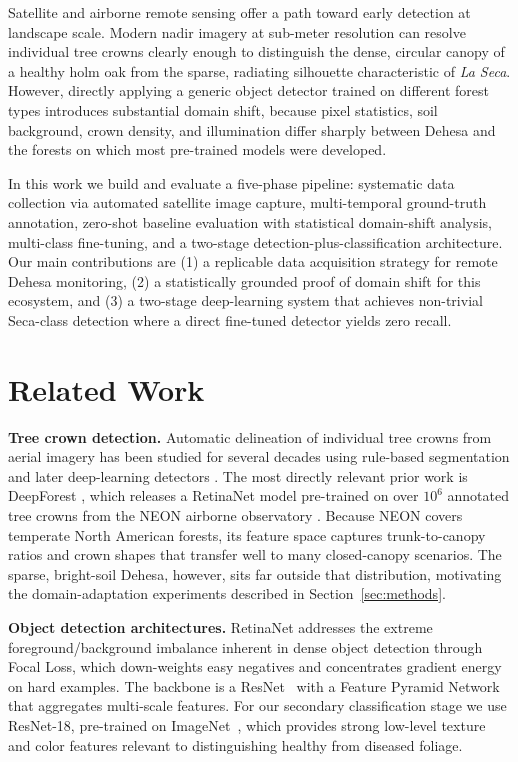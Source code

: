 \documentclass[10pt,twocolumn]{article}
\begin{document}
Satellite and airborne remote sensing offer a path toward early detection at
landscape scale. Modern nadir imagery at sub-meter resolution can resolve
individual tree crowns clearly enough to distinguish the dense, circular
canopy of a healthy holm oak from the sparse, radiating silhouette
characteristic of \textit{La Seca}. However, directly applying a generic
object detector trained on different forest types introduces substantial
domain shift, because pixel statistics, soil background, crown density, and
illumination differ sharply between Dehesa and the forests on which most
pre-trained models were developed.

In this work we build and evaluate a five-phase pipeline: systematic data
collection via automated satellite image capture, multi-temporal ground-truth
annotation, zero-shot baseline evaluation with statistical domain-shift
analysis, multi-class fine-tuning, and a two-stage detection-plus-classification
architecture. Our main contributions are (1) a replicable data acquisition
strategy for remote Dehesa monitoring, (2) a statistically grounded proof of
domain shift for this ecosystem, and (3) a two-stage deep-learning system
that achieves non-trivial Seca-class detection where a direct fine-tuned
detector yields zero recall.

\section{Related Work}
\label{sec:related}

\textbf{Tree crown detection.}
Automatic delineation of individual tree crowns from aerial imagery has
been studied for several decades using rule-based segmentation and later
deep-learning detectors \cite{kattenborn2021review}. The most directly
relevant prior work is DeepForest \cite{weinstein2020deepforest}, which
releases a RetinaNet model pre-trained on over $10^6$ annotated tree crowns
from the NEON airborne observatory \cite{neon2023dataset,weinstein2021benchmark}.
Because NEON covers temperate North American forests, its feature space
captures trunk-to-canopy ratios and crown shapes that transfer well to many
closed-canopy scenarios. The sparse, bright-soil Dehesa, however, sits far
outside that distribution, motivating the domain-adaptation experiments
described in Section~\ref{sec:methods}.

\textbf{Object detection architectures.}
RetinaNet \cite{lin2017focal} addresses the extreme foreground/background
imbalance inherent in dense object detection through Focal Loss, which
down-weights easy negatives and concentrates gradient energy on hard
examples. The backbone is a ResNet~\cite{he2016deep} with a Feature Pyramid
Network~\cite{lin2017fpn} that aggregates multi-scale features. For our
secondary classification stage we use ResNet-18, pre-trained on
ImageNet~\cite{deng2009imagenet}, which provides strong low-level texture
and color features relevant to distinguishing healthy from diseased foliage.
\end{document}

